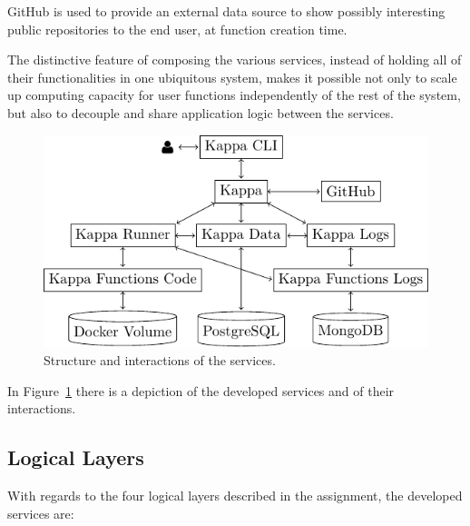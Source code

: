 \documentclass[a4paper]{ifacconf}
\begin{document}
    GitHub is used to provide an external data source to show possibly interesting public repositories to the end user, at function creation time.

    The distinctive feature of composing the various services, instead of holding all of their functionalities in one ubiquitous system, makes it possible not only to scale up computing capacity for user functions independently of the rest of the system, but also to decouple and share application logic between the services.
    
    \begin{figure}
        \centering
        \includegraphics[width=0.9\linewidth]{figures/structure}
        \caption{Structure and interactions of the services.}
        \label{fig:structure}
    \end{figure}

    In Figure~\ref{fig:structure} there is a depiction of the developed services and of their interactions.
    
    \subsection{Logical Layers}
    
    With regards to the four logical layers described in the assignment, the developed services are:
    
\end{document}

